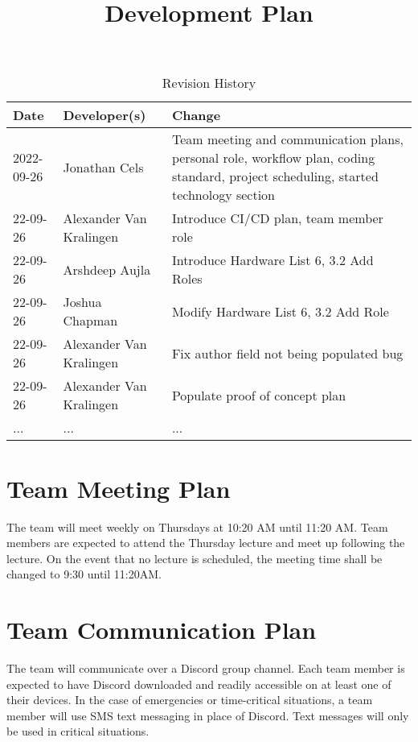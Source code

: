\documentclass{article}
\title{Development Plan\\\progname}
\author{\authname}
\date{}
\begin{document}
\begin{table}[hp]
\caption{Revision History} \label{TblRevisionHistory}
\begin{tabularx}{\textwidth}{llX}
\toprule
\textbf{Date} & \textbf{Developer(s)} & \textbf{Change}\\
\midrule
2022-09-26 & Jonathan Cels & Team meeting and communication plans, personal role, workflow plan, coding standard, project scheduling, started technology section\\
22-09-26 & Alexander Van Kralingen & Introduce CI/CD plan, team member role\\
22-09-26 & Arshdeep Aujla & Introduce Hardware List 6, 3.2 Add Roles\\
22-09-26 & Joshua Chapman & Modify Hardware List 6, 3.2 Add Role\\
22-09-26 & Alexander Van Kralingen & Fix author field not being populated bug\\
22-09-26 & Alexander Van Kralingen & Populate proof of concept plan\\
... & ... & ...\\
\bottomrule
\end{tabularx}
\end{table}

\newpage

\maketitle


\section{Team Meeting Plan}
{The team will meet weekly on Thursdays at 10:20 AM until 11:20 AM. 
Team members are expected to attend the Thursday lecture and meet up following the lecture. 
On the event that no lecture is scheduled, the meeting time shall be changed to 9:30 until 11:20AM.}

\medskip
{}

\section{Team Communication Plan}
{The team will communicate over a Discord group channel. Each team member is expected to have Discord downloaded and readily accessible on at least one of their devices. 
In the case of emergencies or time-critical situations, a team member will use SMS text messaging in place of Discord. Text messages will only be used in critical situations.}
\end{document}
